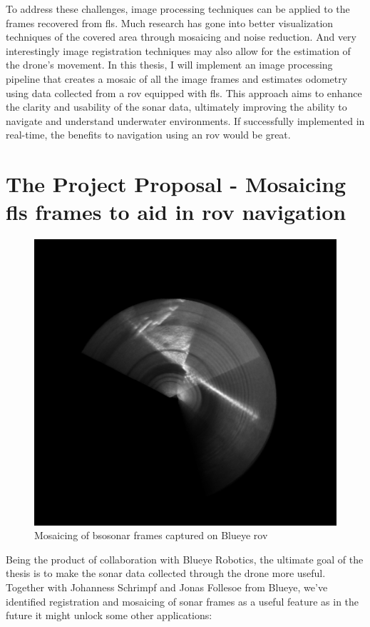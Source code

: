 To address these challenges, image processing techniques can be applied to the frames recovered from \acrshort{fls}. Much research has gone into better visualization techniques of the covered area through mosaicing and noise reduction. And very interestingly image registration techniques may also allow for the estimation of the drone’s movement. In this thesis, I will implement an image processing pipeline that creates a mosaic of all the image frames and estimates odometry using data collected from a \acrfull{rov} equipped with \acrshort{fls}. This approach aims to enhance the clarity and usability of the \acrshort{sonar} data, ultimately improving the ability to navigate and understand underwater environments. If successfully implemented in real-time, the benefits to navigation using an \acrfull{rov} would be great. 

\section{The Project Proposal - Mosaicing \acrshort{fls} frames to aid in \acrshort{rov} navigation}

\begin{figure}[H]
  \centering
  \includegraphics[width=.7\textwidth]{figures/example-output.png}
  \caption[Example mosaicing]{Mosaicing of \acrshort{bsosonar} frames captured on Blueye \acrshort{rov}}
  \label{fig:sonarapp}
\end{figure}

Being the product of collaboration with Blueye Robotics, the ultimate goal of the thesis is to make the \acrshort{sonar} data collected through the drone more useful. Together with Johanness Schrimpf and Jonas Follesoe from Blueye, we've identified registration and mosaicing of \acrshort{sonar} frames as a useful feature as in the future it might unlock some other applications:

